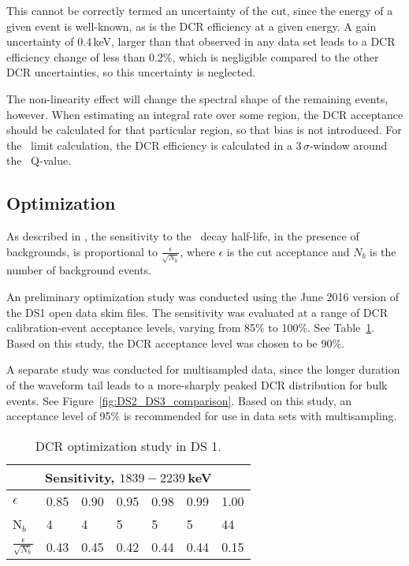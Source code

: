 This cannot be correctly termed an uncertainty of the cut, since the energy of a given event is well-known, as is the DCR efficiency at a given energy. A gain uncertainty of 0.4\,keV, larger than that observed in any data set \cite{EnergyUnidoc} leads to a DCR efficiency change of less than 0.2\%, which is negligible compared to the other DCR uncertainties, so this uncertainty is neglected. 

The non-linearity effect will change the spectral shape of the remaining events, however. When estimating an integral rate over some region, the DCR acceptance should be calculated for that particular region, so that bias is not introduced. For the \nonubb\ limit calculation, the DCR efficiency is calculated in a 3\,$\sigma$-window around the \nonubb\ Q-value. 

\subsection{Optimization}
As described in \cite{Detwiler_sensitivity}, the sensitivity to the \nonubb\ decay half-life, in the presence of backgrounds, is proportional to $\frac{\epsilon}{\sqrt{N_b}}$, where $\epsilon$ is the cut acceptance and $N_b$ is the number of background events. 

An preliminary optimization study was conducted using the June 2016 version of the DS1 open data skim files. The sensitivity was evaluated at a range of DCR calibration-event acceptance levels, varying from 85\% to 100\%. See Table~\ref{tab:DCR_opt}. Based on this study, the DCR acceptance level was chosen to be 90\%. 

A separate study was conducted for multisampled data, since the longer duration of the waveform tail leads to a more-sharply peaked DCR distribution for bulk events. See Figure~\ref{fig:DS2_DS3_comparison}. Based on this study, an acceptance level of 95\% is recommended for use in data sets with multisampling. 

\begin{table}[h]
\centering
\begin{tabular}{l | l l l l l l}
\hline
\multicolumn{7}{c}{Sensitivity, $1839 - 2239~$keV} \\
\hline
$\epsilon$ & 0.85 & 0.90 & 0.95 & 0.98 & 0.99 & 1.00 \\
N$_{b}$ & 4 & 4 & 5 & 5 & 5 & 44\\
$\frac{\epsilon}{\sqrt{N_b}}$ & 0.43 & 0.45 & 0.42 & 0.44 & 0.44 & 0.15\\
\end{tabular}
 \caption{DCR optimization study in DS 1.} 
 \label{tab:DCR_opt}
\end{table}

